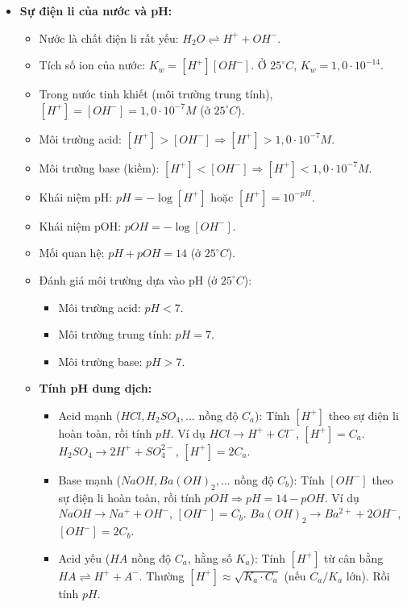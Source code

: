 \begin{phuongphap}
\begin{itemize}
    \item \textbf{Sự điện li của nước và pH:}
        \begin{itemize}
	            \item Nước là chất điện li rất yếu: $H_2O \rightleftharpoons H^+ + OH^-$.
	            \item Tích số ion của nước: $K_w = [H^+][OH^-]$. Ở $25^\circ C$, $K_w = 1,0 \cdot 10^{-14}$.
	            \item Trong nước tinh khiết (môi trường trung tính), $[H^+] = [OH^-] = 1,0 \cdot 10^{-7} M$ (ở $25^\circ C$).
	            \item Môi trường acid: $[H^+] > [OH^-] \Rightarrow [H^+] > 1,0 \cdot 10^{-7} M$.
	            \item Môi trường base (kiềm): $[H^+] < [OH^-] \Rightarrow [H^+] < 1,0 \cdot 10^{-7} M$.
	            \item Khái niệm pH: $pH = -\log[H^+]$ hoặc $[H^+] = 10^{-pH}$.
	            \item Khái niệm pOH: $pOH = -\log[OH^-]$.
	            \item Mối quan hệ: $pH + pOH = 14$ (ở $25^\circ C$).
	            \item Đánh giá môi trường dựa vào pH (ở $25^\circ C$):
	                \begin{itemize}
		                    \item Môi trường acid: $pH < 7$.
		                    \item Môi trường trung tính: $pH = 7$.
		                    \item Môi trường base: $pH > 7$.
		                \end{itemize}
	            \item \textbf{Tính pH dung dịch:}
	                \begin{itemize}
		                    \item Acid mạnh ($HCl, H_2SO_4,...$ nồng độ $C_a$): Tính $[H^+]$ theo sự điện li hoàn toàn, rồi tính $pH$. Ví dụ $HCl \rightarrow H^+ + Cl^-$, $[H^+]=C_a$. $H_2SO_4 \rightarrow 2H^+ + SO_4^{2-}$, $[H^+]=2C_a$.
		                    \item Base mạnh ($NaOH, Ba(OH)_2,...$ nồng độ $C_b$): Tính $[OH^-]$ theo sự điện li hoàn toàn, rồi tính $pOH \Rightarrow pH = 14 - pOH$. Ví dụ $NaOH \rightarrow Na^+ + OH^-$, $[OH^-]=C_b$. $Ba(OH)_2 \rightarrow Ba^{2+} + 2OH^-$, $[OH^-]=2C_b$.
		                    \item Acid yếu ($HA$ nồng độ $C_a$, hằng số $K_a$): Tính $[H^+]$ từ cân bằng $HA \rightleftharpoons H^+ + A^-$. Thường $[H^+] \approx \sqrt{K_a \cdot C_a}$ (nếu $C_a/K_a$ lớn). Rồi tính $pH$.

\end{itemize}
\end{itemize}
\end{itemize}
\end{phuongphap}
